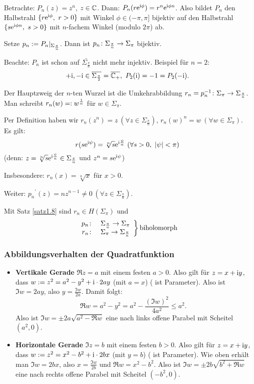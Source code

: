 \documentclass[a4paper,twoside,DIV15,BCOR12mm]{scrbook}
\begin{document}
Betrachte: $P_n(z) = z^n$, $z\in\mathbb{C}$. Dann: $P_n(r\mathrm{e}^{\mathrm{i}\phi})=r^n\mathrm{e}^{\mathrm{i}\phi n}$. Also bildet $P_n$ den Halbstrahl $\{r\e^{\i\phi},\ r>0\}$ mit Winkel $\phi\in(-\pi,\pi]$ bijektiv auf den Halbstrahl $\{s\mathrm{e}^{\mathrm{i}\phi n},\ s>0\}$ mit $n$-fachem Winkel (modulo $2\pi$) ab.

Setze $p_n:= {P_n}|_{\Sigma_\frac{\pi}{n}}$. Dann ist $p_n\colon\Sigma_\frac{\pi}{n} \rightarrow \Sigma_\pi$ bijektiv.

Beachte: $P_n$ ist schon auf $\bar{\Sigma_\frac{\pi}{n}}$ nicht mehr injektiv. Beispiel für $n=2$:
\[+\mathrm{i},-\mathrm{i}\in\overline{\Sigma_\frac{\pi}{2}} = \overline{\mathbb{C}_+},\ P_2(\mathrm{i}) = -1 = P_2 (-\mathrm{i}).\]

\begin{dfn}\label{dfn1.12} Der Hauptzweig der $n$-ten Wurzel ist die Umkehrabbildung $r_n = p_n^{-1}\colon \Sigma_\pi\rightarrow \Sigma_\frac{\pi}{n}$. Man schreibt $r_n(w) =: w^\frac{1}{n}$ für $w\in\Sigma_\pi$.
\end{dfn}


Per Definition haben wir $r_n(z^n) = z\ (\forall z\in\Sigma_\frac{\pi}{n})$, $r_n(w)^n = w\ (\forall w\in\Sigma_\pi)$. Es gilt:
\begin{equation}\label{1.5}
r(s\e^{\i\psi}) = \sqrt[n]{s}\e^{\i\frac{\psi}{n}}\ (\forall s > 0,\ |\psi| < \pi)
\end{equation}
(denn: $z=\sqrt[n]{s}\mathrm{e}^{\mathrm{i}\frac{\psi}{n}}\in\Sigma_\frac{\pi}{n}$ und $z^n = s\mathrm{e}^{\mathrm{i}\psi}$)

Insbesondere: $r_n(x) = \sqrt[n]{x}$ für $x>0$.

Weiter: ${p_n}^\prime(z) = nz^{n-1}\neq 0\ (\forall z\in\Sigma_\frac{\pi}{n})$.

Mit Satz \ref{satz1.8} sind $r_n\in H(\Sigma_\pi)$ und
\[\left.\begin{array}{r l}p_n\colon&\Sigma_\frac{\pi}{n}\rightarrow\Sigma_\pi\\r_n\colon&\Sigma_\pi\rightarrow\Sigma_\frac{\pi}{n}\end{array}\right\}\text{biholomorph}\]

\subsubsection*{Abbildungsverhalten der Quadratfunktion}
\begin{itemize}
\item {\bf Vertikale Gerade} $\Re z = a$ mit einem festen $a>0$. Also gilt für $z=x+\mathrm{i} y$, dass $w := z^2=a^2-y^2 + \mathrm{i}\cdot2ay$
  (mit $a=x$) ( ist Parameter). Also ist $\Im w = 2ay$, also $y = \frac{\Im w}{2a}$. Damit folgt:
  \[\Re w = a^2-y^2 = a^2 - \frac{(\Im w)^2}{4a^2} \le a^2.\]
  Also ist $\Im w = \pm 2a\sqrt{a^2-\Re w}$ eine nach links offene Parabel mit Scheitel $(a^2,0)$.
\item {\bf Horizontale Gerade} $\Im z = b$ mit einem festen $b>0$. Also gilt für $z=x+\mathrm{i} y$, dass $w := z^2 = x^2-b^2 + \mathrm{i}\cdot
  2bx$ (mit $y=b$) ( ist Parameter). Wie oben erhält man $\Im w = 2bx$, also $x=\frac{\Im w}{2b}$ und $\Re w =
  x^2-b^2$. Also ist $\Im w = \pm 2b\sqrt{b^2+\Re w}$ eine nach rechts offene Parabel mit Scheitel $(-b^2,0)$.
\end{itemize}
\end{document}
